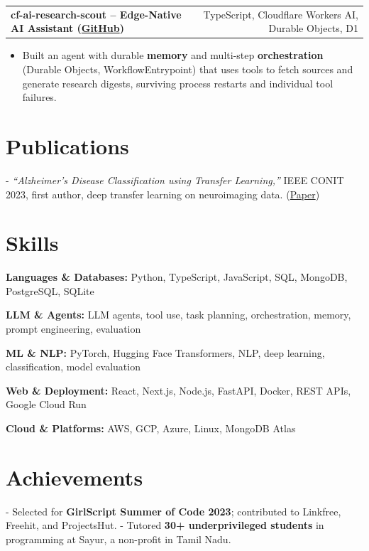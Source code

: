 \documentclass[letterpaper,11pt]{article}
\makeatletter
\newcommand{\projItem}[2]{%
  \vspace{6pt}
  \begin{tabular*}{\textwidth}{@{}l@{\extracolsep{\fill}}r@{}}
    \textbf{#1} & #2 \\
  \end{tabular*}\par\vspace{-2pt}
}
\newcommand{\skillLine}[2]{\textbf{#1:} #2\par\vspace{2pt}}
\newcommand{\inlineBlock}[1]{{\setlength{\leftskip}{0.18in}\small #1\par}}
\makeatother
\begin{document}
\projItem{cf-ai-research-scout -- Edge-Native AI Assistant {\normalfont\small(\href{https://github.com/Deva-1903/cf_ai_research_scout}{GitHub})}}{TypeScript, Cloudflare Workers AI, Durable Objects, D1}
\begin{itemize}
  \item Built an agent with durable \textbf{memory} and multi-step \textbf{orchestration} (Durable Objects, WorkflowEntrypoint) that uses tools to fetch sources and generate research digests, surviving process restarts and individual tool failures.
\end{itemize}

\section{Publications}
\inlineBlock{- \textit{``Alzheimer's Disease Classification using Transfer Learning,''} IEEE CONIT 2023, first author, deep transfer learning on neuroimaging data. {\normalfont\small(\href{https://ieeexplore.ieee.org/document/10205760}{Paper})}}

\section{Skills}
\skillLine{Languages \& Databases}{Python, TypeScript, JavaScript, SQL, MongoDB, PostgreSQL, SQLite}
\skillLine{LLM \& Agents}{LLM agents, tool use, task planning, orchestration, memory, prompt engineering, evaluation}
\skillLine{ML \& NLP}{PyTorch, Hugging Face Transformers, NLP, deep learning, classification, model evaluation}
\skillLine{Web \& Deployment}{React, Next.js, Node.js, FastAPI, Docker, REST APIs, Google Cloud Run}
\skillLine{Cloud \& Platforms}{AWS, GCP, Azure, Linux, MongoDB Atlas}

\section{Achievements}
\inlineBlock{- Selected for \textbf{GirlScript Summer of Code 2023}; contributed to Linkfree, Freehit, and ProjectsHut. - Tutored \textbf{30+ underprivileged students} in programming at Sayur, a non-profit in Tamil Nadu.}
\end{document}
